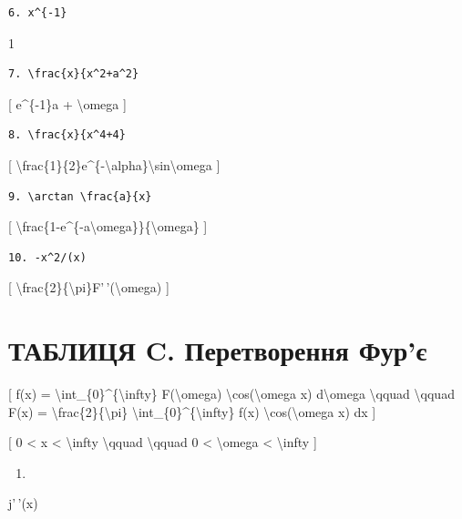 \documentclass[
]{article}
\providecommand{\tightlist}{%
  \setlength{\itemsep}{0pt}\setlength{\parskip}{0pt}}
\begin{document}
\begin{verbatim}
6. x^{-1}
\end{verbatim}

1

\begin{verbatim}
7. \frac{x}{x^2+a^2}
\end{verbatim}

{[} e\^{}\{-1\}a + \textbackslash omega {]}

\begin{verbatim}
8. \frac{x}{x^4+4}
\end{verbatim}

{[}
\textbackslash frac\{1\}\{2\}e\^{}\{-\textbackslash alpha\}\textbackslash sin\textbackslash omega
{]}

\begin{verbatim}
9. \arctan \frac{a}{x}
\end{verbatim}

{[}
\textbackslash frac\{1-e\^{}\{-a\textbackslash omega\}\}\{\textbackslash omega\}
{]}

\begin{verbatim}
10. -x^2/(x)
\end{verbatim}

{[}
\textbackslash frac\{2\}\{\textbackslash pi\}F'\,'(\textbackslash omega)
{]}

\section{ТАБЛИЦЯ C. Перетворення
Фур'є}\label{ux442ux430ux431ux43bux438ux446ux44f-c.-ux43fux435ux440ux435ux442ux432ux43eux440ux435ux43dux43dux44f-ux444ux443ux440ux454}

{[} f(x) = \textbackslash int\_\{0\}\^{}\{\textbackslash infty\}
F(\textbackslash omega) \textbackslash cos(\textbackslash omega x)
d\textbackslash omega \textbackslash qquad \textbackslash qquad F(x) =
\textbackslash frac\{2\}\{\textbackslash pi\}
\textbackslash int\_\{0\}\^{}\{\textbackslash infty\} f(x)
\textbackslash cos(\textbackslash omega x) dx {]}

{[} 0 \textless{} x \textless{} \textbackslash infty
\textbackslash qquad \textbackslash qquad 0 \textless{}
\textbackslash omega \textless{} \textbackslash infty {]}

\begin{enumerate}
\def\labelenumi{\arabic{enumi}.}
\tightlist
\item
\end{enumerate}

j'\,'(x)
\end{document}
